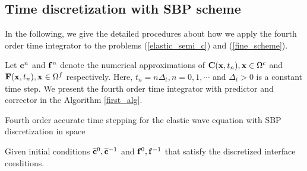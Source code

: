 \subsection{Time discretization with SBP scheme}
In the following, we give the detailed procedures about how we apply the fourth order time integrator to the problems (\ref{elastic_semi_c}) and  (\ref{fine_scheme}). 

Let ${\bf c}^{n}$ and ${\bf f}^{n}$ denote the numerical approximations of ${\bf C}({\bf x},t_n), {\bf x}\in\Omega^c$ and ${\bf F}({\bf x},t_n), {\bf x}\in\Omega^f$ respectively. Here, $t_n = n\Delta_t, n = 0,1,\cdots$ and $\Delta_t > 0$ is a constant time step. We present the fourth order time integrator with predictor and corrector in the Algorithm \ref{first_alg}.
~\\
\begin{breakablealgorithm}
	\caption{Fourth order accurate time stepping for the elastic wave equation with SBP discretization in space}\label{first_alg}
	Given initial conditions $\widetilde{{\bf c}}^{0}, \widetilde{{\bf c}}^{-1}$ and ${\bf f}^{0}, {\bf f}^{-1}$ that satisfy the discretized interface conditions.
	

\end{breakablealgorithm}
